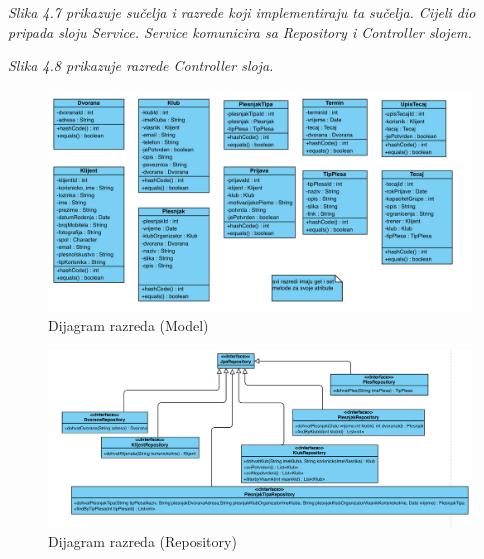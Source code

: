 			\textit{Slika 4.7 prikazuje sučelja i razrede koji implementiraju ta sučelja. Cijeli dio pripada sloju Service. Service komunicira sa Repository i Controller slojem.}
			\bigskip
			
				\textit{Slika 4.8 prikazuje razrede Controller sloja.}
			\bigskip
			
			
			\begin{figure}[H]
				\centering
				\includegraphics[width=\textwidth]{slike/dijagram_razreda/model.png}
				\caption{Dijagram razreda (Model)}
				\label{fig:my_label}
		    \end{figure}
	    	
	    	\begin{figure}[H]
	    		\centering
	    		\includegraphics[width=\textwidth]{slike/dijagram_razreda/repository.png}
	    		\caption{Dijagram razreda (Repository)}
	    		\label{fig:my_label}
	    	\end{figure}
    	
